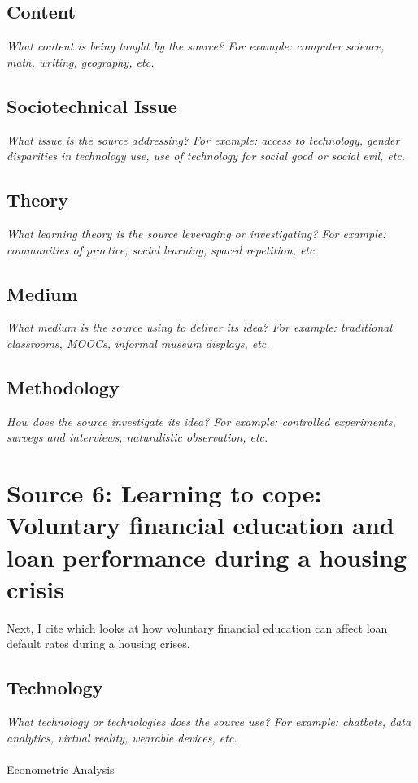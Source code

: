 \documentclass[12pt, final]{article}
\begin{document}
\subsection{Content}
\textit{What content is being taught by the source? For example: computer science, math, writing, geography, etc.}

\subsection{Sociotechnical Issue}
\textit{What issue is the source addressing? For example: access to technology, gender disparities in technology use, use of technology for social good or social evil, etc.}

\subsection{Theory}
\textit{What learning theory is the source leveraging or investigating? For example: communities of practice, social learning, spaced repetition, etc.}

\subsection{Medium}
\textit{What medium is the source using to deliver its idea? For example: traditional classrooms, MOOCs, informal museum displays, etc.}

\subsection{Methodology}
\textit{How does the source investigate its idea? For example: controlled experiments, surveys and interviews, naturalistic observation, etc.}

\section{Source 6: Learning to cope: Voluntary financial education and loan performance during a housing crisis}
\label{Source 6}

Next, I cite \cite{Agarwal} which looks at how voluntary financial education can affect loan default rates during a housing crises.

\subsection{Technology}
\textit{What technology or technologies does the source use? For example: chatbots, data analytics, virtual reality, wearable devices, etc.}
\\
\\
Econometric Analysis
\end{document}

